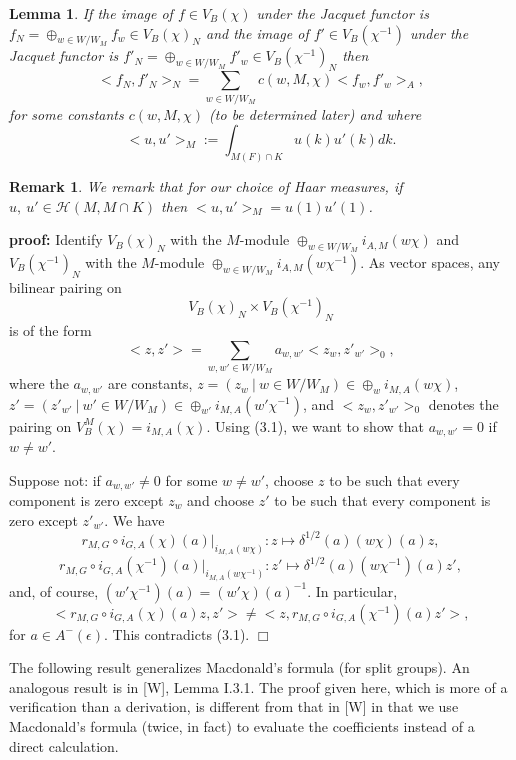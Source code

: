 \documentclass[12pt]{article}
\newtheorem{lemma}{Lemma}[section]
\newtheorem{remark}{Remark}
\newenvironment{pf}[1][proof:]{\par\medskip\noindent\textbf{#1} }{\par\medskip}
\begin{document}
\begin{lemma}
If the image of $f\in V_B(\chi)$ under the Jacquet functor is $f_N=\oplus_{w\in W/W_M}f_w\in V_B(\chi)_N$ and the image of $f'\in V_B(\chi^{-1})$ under the Jacquet functor is $f'_N=\oplus_{w\in W/W_M}f'_w\in V_B(\chi^{-1})_N$ then
\[
<f_N,f'_N>_N=\sum_{w\in W/W_M}c(w,M,\chi)<f_w,f'_w>_A,
\]
for some constants $c(w,M,\chi)$ (to be determined later) and where
\[
<u,u'>_M:=\int_{M(F)\cap K}u(k)u'(k)dk.
\]
\end{lemma}

\begin{remark}
We remark that for our choice of Haar measures, if $u,\ u'\in\mathcal{H}(M,M\cap K)$ then $<u,u'>_M=u(1)u'(1)$.
\end{remark}

\begin{pf}
Identify $V_B(\chi)_N$ with the $M$-module $\oplus_{w\in W/W_M}i_{A,M}(w\chi)$ and $V_B(\chi^{-1})_N$ with the $M$-module $\oplus_{w\in W/W_M}i_{A,M}(w\chi^{-1})$. As vector spaces, any bilinear pairing on
\[
V_B(\chi)_N\times V_B(\chi^{-1})_N
\]
is of the form
\[
<z,z'>=\sum_{w,w'\in W/W_M}a_{w,w'}<z_w,z'_{w'}>_0,
\]
where the $a_{w,w'}$ are constants, $z=(z_w\ |\ w\in W/W_M)\in\oplus_wi_{M,A}(w\chi)$, $z'=(z'_{w'}\ |\ w'\in W/W_M)\in\oplus_{w'}i_{M,A}(w'\chi^{-1})$, and $<z_w,z'_{w'}>_0$ denotes the pairing on $V_B^M(\chi)=i_{M,A}(\chi)$. Using (3.1), we want to show that $a_{w,w'}=0$ if $w\neq w'$.

Suppose not: if $a_{w,w'}\neq0$ for some $w\neq w'$, choose $z$ to be such that every component is zero except $z_w$ and choose $z'$ to be such that every component is zero except $z'_{w'}$. We have
\[
r_{M,G}\circ i_{G,A}(\chi)(a)|_{i_{M,A}(w\chi)}:z\longmapsto\delta^{1/2}(a)(w\chi)(a)z,
\]
\[
r_{M,G}\circ i_{G,A}(\chi^{-1})(a)|_{i_{M,A}(w\chi^{-1})}:z'\longmapsto\delta^{1/2}(a)(w\chi^{-1})(a)z',
\]
and, of course, $(w'\chi^{-1})(a)=(w'\chi)(a)^{-1}$. In particular,
\[
<r_{M,G}\circ i_{G,A}(\chi)(a)z,z'>\neq<z,r_{M,G}\circ i_{G,A}(\chi^{-1})(a)z'>,
\]
for $a\in A^-(\epsilon)$. This contradicts (3.1). $\Box$
\end{pf}

The following result generalizes Macdonald's formula (for split groups). An analogous result is in [W], Lemma I.3.1. The proof given here, which is more of a verification than a derivation, is different from that in [W] in that we use Macdonald's formula (twice, in fact) to evaluate the coefficients instead of a direct calculation.
\end{document}
